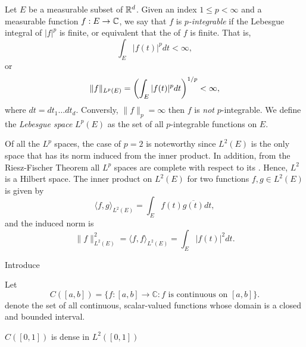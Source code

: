 \documentclass[../thesis.tex]{subfiles}
\begin{document}
\begin{definition}
    Let $E$ be a measurable subset of $\mathbb{R}^d$. Given an index $1 \leq p < \infty$ and a measurable function $f:E\rightarrow \mathbb{C}$, we say that $f$ is \emph{$p$-integrable} if the Lebesgue integral of $|f|^p$ is finite, or equivalent that the \LPnorm of $f$ is finite. That is,
    \begin{equation*}
        \int_{E} |f(t)|^p dt < \infty,
    \end{equation*}
    or 
    \begin{equation*}
        \|f\|_{L^p(E)} = \left(\int_{E} |f(t)|^p dt\right)^{1/p}< \infty,
    \end{equation*}
    where $dt= dt_1 \dots dt_d$. Conversly, $\|f\|_p = \infty$ then $f$ is \emph{not} $p$-integrable. We define the \emph{Lebesgue space} $L^p(E)$ as the set of all $p$-integrable functions on $E$. %
\end{definition}

Of all the $L^p$ spaces, the case of $p=2$ is noteworthy since $L^2(E)$ is the only space that has its norm induced from the inner product.
In addition, from the Riesz-Fischer Theorem \cite[p.~279]{heilIntroductionRealAnalysis2019} all $L^p$ spaces are complete with respect to its \LPnorm. Hence, $L^2$ is a Hilbert space. The inner product on $L^2(E)$ for two functions $f,g\in L^2(E)$ is given by
\begin{equation}
    \langle f, g\rangle_{L^2(E)} = \int_{E} f(t)\overline{g(t)} dt,
\end{equation}
and the induced norm is 
\begin{equation}
    \|f\|_{L^2(E)}^2 = \langle f, f\rangle_{L^2(E)} = \int_{E} |f(t)|^2 dt.
\end{equation}




Introduce

Let
\begin{equation}
    C([a,b]) = \{f:[a,b] \rightarrow \mathbb{C}: f \text{ is continuous on } [a,b]\}.
\end{equation}
denote the set of all continuous, scalar-valued functions whose domain is a closed and bounded interval.

\begin{lemma}
    $C([0,1])$ is dense in $L^2([0,1])$
\end{lemma}
\end{document}
